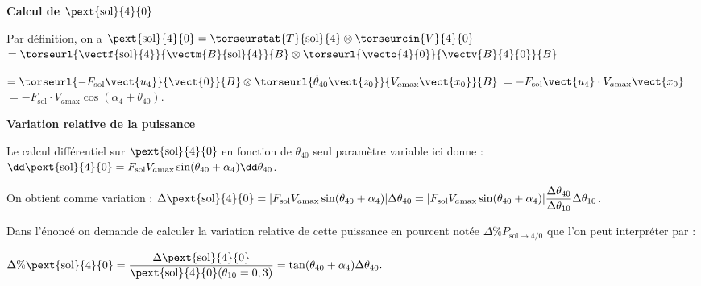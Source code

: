 \documentclass[11pt]{article}
\begin{document}
\begin{UPSTIcorrige}
\textbf{Calcul de $\pext{\text{sol}}{4}{0}$}

Par définition, on a $\pext{\text{sol}}{4}{0} = \torseurstat{T}{\text{sol}}{4} \otimes \torseurcin{V}{4}{0}$
$ = \torseurl{\vectf{\text{sol}}{4}}{\vectm{B}{\text{sol}}{4}}{B} \otimes \torseurl{\vecto{4}{0}}{\vectv{B}{4}{0}}{B}$

$ = \torseurl{-F_{\text{sol}}\vect{u_4}}{\vect{0}}{B} \otimes \torseurl{\dot{\theta}_{40}\vect{z_0}}{V_{a \text{max}} \vect{x_0}}{B} $ $ = -F_{\text{sol}}\vect{u_4} \cdot V_{a \text{max}} \vect{x_0}$
$ = -F_{\text{sol}}\cdot V_{a \text{max}} \cos \left(\alpha_4 + \theta_{40}\right) $.


\textbf{Variation relative de la puissance}


%
%
%
%

Le calcul différentiel sur  $\pext{\text{sol}}{4}{0}$ en fonction de $\theta_{40}$ seul paramètre variable ici donne : 
$
\dd \pext{\text{sol}}{4}{0}=F_{\text{sol}}V_{a \text{max}}\sin (\theta_{40}+\alpha_4)\dd \theta_{40}
$.

On obtient comme variation : 
$
\Delta  \pext{\text{sol}}{4}{0} =\vert F_{\text{sol}}V_{a \text{max}}\sin (\theta_{40}+\alpha_4) \vert\Delta \theta_{40}=\vert F_{\text{sol}}V_{a \text{max}}\sin (\theta_{40}+\alpha_4)\vert\dfrac{\Delta \theta_{40}}{\Delta \theta_{10}} \Delta \theta_{10}
$.



\begin{minipage}{0.55\textwidth}

Dans l'énoncé on demande de calculer la variation relative de cette puissance en pourcent notée $\Delta \% P_{\text{sol}\to 4/0}$ que l'on peut interpréter par : 

$
\Delta \%\pext{\text{sol}}{4}{0}=\dfrac{\Delta \pext{\text{sol}}{4}{0}}{\pext{\text{sol}}{4}{0}(\theta_{10}=0,3)}=\tan (\theta_{40}+\alpha_4)\Delta \theta_{40}.
$


\end{minipage}
\end{UPSTIcorrige}
\end{document}
